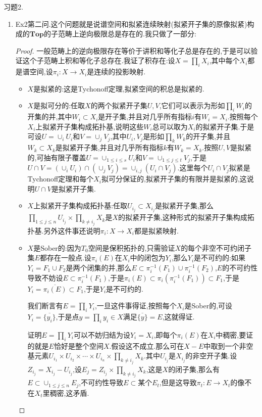 习题2.
\begin{enumerate}
	\item Ex2第二问.这个问题就是说谱空间和拟紧连续映射(拟紧开子集的原像拟紧)构成的$\textbf{Top}$的子范畴上逆向极限总是存在的.我只做了一部分:
	\begin{proof}
		
		一般范畴上的逆向极限存在等价于讲积和等化子总是存在的,于是可以验证这个子范畴上积和等化子总存在.我证了积存在:设$X=\prod_iX_i$,其中每个$X_i$都是谱空间,设$\pi_i:X\to X_i$是连续的投影映射.
		\begin{itemize}
			\item $X$是拟紧的:这是Tychonoff定理,拟紧空间的积总是拟紧的.
			\item $X$是拟可分的:任取$X$的两个拟紧开子集$U,V$,它们可以表示为形如$\prod_iW_i$的开集的并,其中$W_i\subset X_i$是开子集,并且对几乎所有指标$i$有$W_i=X_i$.按照每个$X_i$上拟紧开子集构成拓扑基,说明这些$W_i$总可以取为$X_i$的拟紧开子集.于是可设$U=\cup_iU_i$和$V=\cup_jV_j$,其中$U_i,V_j$是形如$\prod_kW_k$的开子集,并且$W_k\subset X_k$是拟紧开子集,并且对几乎所有指标$k$有$W_k=X_k$.按照$U,V$是拟紧的,可抽有限子覆盖$U=\cup_{1\le i\le s}U_i$和$V=\cup_{1\le j\le t}V_j$,于是$U\cap V=(\cup_iU_i)\cap(\cup_jV_j)=\cup_{i,j}(U_i\cap V_j)$.这里每个$U_i\cap V_j$拟紧是Tychonoff定理和每个$X_i$拟可分保证的,拟紧开子集的有限并是拟紧的,这说明$U\cap V$是拟紧开子集.
			\item $X$上拟紧开子集构成拓扑基:任取$U_{i_j}\subset X_{i_j}$是拟紧开子集,那么$\prod_{1\le j\le n}U_{i_j}\times\prod_{k\not=i_j}X_k$是$X$的拟紧开子集,这种形式的拟紧开子集构成拓扑基.另外这件事还说明$\pi_i:X\to X_i$都是拟紧映射.
			\item $X$是Sober的:因为$T_0$空间是保积拓扑的,只需验证$X$的每个非空不可约闭子集$E$都存在一般点.设$\pi_i(E)$在$X_i$中的闭包为$Y_i$,那么$Y_i$是不可约的:如果$Y_i=F_1\cup F_2$是两个闭集的并,那么$E\subset\pi_i^{-1}(F_1)\cup\pi_i^{-1}(F_2)$,$E$的不可约性导致不妨设$E\subset\pi_i^{-1}(F_1)$,于是$\pi_i(E)\subset\pi_i(\pi_i^{-1}(F_1))\subset F_1$,于是$Y_i=\overline{\pi_i(E)}\subset F_1$,于是$Y_i$是不可约的.
			
			我们断言有$E=\prod_iY_i$,一旦这件事得证,按照每个$X_i$是Sober的,可设$Y_i=\overline{\{y_i\}}$,于是点$y=\prod_iy_i\in X$满足$\overline{\{y\}}=E$,这就得证.
			
			证明$E=\prod_iY_i$可以不妨归结为设$Y_i=X_i$,即每个$\pi_i(E)$在$X_i$中稠密,要证的就是$E$恰好是整个空间$X$.假设这不成立.那么可在$X-E$中取到一个非空基元素$U_{i_1}\times U_{i_2}\times\cdots\times U_{i_n}\times\prod_{k\not=i_j}X_k$.其中$U_{i_j}$是$X_{i_j}$的非空开子集.设$Z_{i_j}=X_{i_j}-U_{i_j}$,设$E_j=Z_{i_j}\times\prod_{k\not=i_j}X_k$,这是$X$的闭子集,那么有$E\subset\cup_{1\le j\le n}E_j$,不可约性导致$E\subset$某个$E_t$,但是这导致$\pi_t:E\to X_t$的像不在$X_t$里稠密,这矛盾.
		\end{itemize}
		

\end{proof}
\end{enumerate}
